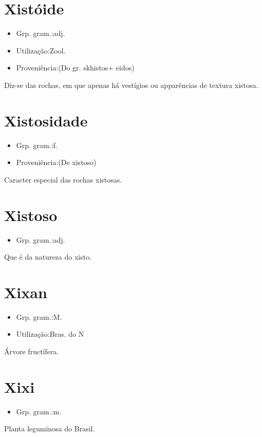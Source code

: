 \section{Xistóide}
\begin{itemize}
\item {Grp. gram.:adj.}
\end{itemize}
\begin{itemize}
\item {Utilização:Zool.}
\end{itemize}
\begin{itemize}
\item {Proveniência:(Do gr. \textunderscore skhistos\textunderscore  + \textunderscore eidos\textunderscore )}
\end{itemize}
Diz-se das rochas, em que apenas há vestígios ou apparências de textura xistosa.
\section{Xistosidade}
\begin{itemize}
\item {Grp. gram.:f.}
\end{itemize}
\begin{itemize}
\item {Proveniência:(De \textunderscore xistoso\textunderscore )}
\end{itemize}
Caracter especial das rochas xistosas.
\section{Xistoso}
\begin{itemize}
\item {Grp. gram.:adj.}
\end{itemize}
Que é da natureza do xisto.
\section{Xixan}
\begin{itemize}
\item {Grp. gram.:M.}
\end{itemize}
\begin{itemize}
\item {Utilização:Bras. do N}
\end{itemize}
Árvore fructífera.
\section{Xixi}
\begin{itemize}
\item {Grp. gram.:m.}
\end{itemize}
Planta leguminosa do Brasil.
